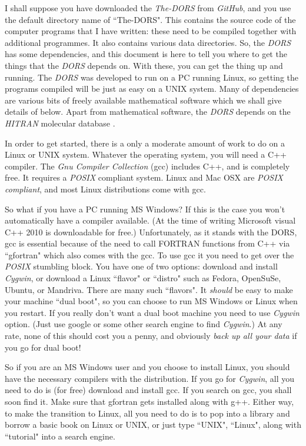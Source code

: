 \documentclass[12pt]{article}
\begin{document}
I shall suppose you have downloaded the {\it The-DORS} from {\it GitHub}, and you use the default directory name
of ``The-DORS". This contains the source code of the computer programs that
I have written: these need to be compiled together with additional programmes.
It also contains various data directories.
 So, the {\it DORS} has some dependencies, and this document is here to tell you
where to get the things that the {\it DORS} depends on. With these, you can get the thing up and running.
The {\it DORS} was developed to run on a PC running Linux, so getting the programs compiled
will be just as easy on a UNIX system. Many of  dependencies are  various bits of freely
available mathematical software which we shall give details of below. Apart from mathematical
software, the {\it DORS}
 depends on the {\it HITRAN}
molecular database \cite{RothmanETAL:Mybib}.

 In order to get started, there is a only a moderate
amount of work to do on a Linux or UNIX system. Whatever the operating system, you will need a C++ compiler.
The {\it Gnu Compiler Collection} (gcc) includes C++, and is  completely free. It requires a {\it POSIX} compliant system.
Linux and Mac OSX are { \it POSIX compliant}, and most Linux distributions come with gcc. 

 So what if you have
a PC running MS Windows? 
If this is the
case you won't automatically have a compiler available. (At the time of writing Microsoft visual C++ 2010 is
 downloadable for free.) Unfortunately, as it stands with the DORS, gcc is essential because of the need to
call FORTRAN functions from C++ via ``gfortran" which also comes with the gcc. To use gcc it you need 
to get over the {\it POSIX} stumbling block. 
You have one of two options: download and install {\it Cygwin}, or download a Linux ``flavor" or ``distro" 
 such as Fedora, OpenSuSe, Ubuntu, or Mandriva. There are many such ``flavors". It {\it should} be easy to make
your machine ``dual boot", so you can choose to run MS Windows or Linux when you restart.
If you  really don't want a dual boot machine you need to use {\it Cygwin} option. (Just use google or some other search engine
to find {\it Cygwin}.) At any rate, none of this should cost you a penny, and obviously {\it back up all
your data } if you go for dual boot! 


So if you are an MS Windows user  and you choose to install Linux, you should have the necessary compilers
with the distribution. If you
go for {\it Cygwin}, all
you need to do is (for free) download and install gcc.
If you search on gcc, you shall soon find it. Make sure that gfortran gets installed
along with g++. 
Either way, to make the transition to Linux, all you need to do is to pop into a library and borrow a basic book on Linux
 or UNIX, or just type ``UNIX", ``Linux", along with  ``tutorial" into a search engine.
\end{document}
